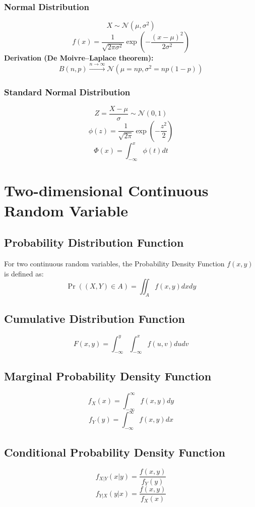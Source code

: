 \documentclass{article}
\begin{document}
\subsubsection{Normal Distribution}
\[ X \sim \mathcal{N}(\mu, \sigma^2) \]
\[
    f(x) = \frac{1}{\sqrt{2\pi\sigma^2}} \exp\left( -\frac{(x-\mu)^2}{2\sigma^2} \right)
\]
\textbf{Derivation (De Moivre–Laplace theorem):}
\[
    B(n, p) \xrightarrow{n \to \infty} \mathcal{N}(\mu = np, \sigma^2 = np(1-p))
\]

\subsubsection{Standard Normal Distribution}
\[ Z = \frac{X-\mu}{\sigma} \sim \mathcal{N}(0,1) \]
\[
    \phi(z) = \frac{1}{\sqrt{2\pi}} \exp\left( -\frac{z^2}{2} \right)
\]
\[
    \Phi(x) = \int_{-\infty}^{x} \phi(t)dt
\]

\newpage
\section{Two-dimensional Continuous Random Variable}

\subsection{Probability Distribution Function}
For two continuous random variables, the Probability Density Function \( f(x,y) \) is defined as:
\[
    \Pr((X,Y) \in A) = \iint_{A} f(x,y) dx dy
\]

\subsection{Cumulative Distribution Function}
\[
    F(x,y) = \int_{-\infty}^{y} \int_{-\infty}^{x} f(u,v) du dv
\]

\subsection{Marginal Probability Density Function}
\[
    f_X(x) = \int_{-\infty}^{\infty} f(x,y)dy
\]
\[
    f_Y(y) = \int_{-\infty}^{\infty} f(x,y)dx
\]

\subsection{Conditional Probability Density Function}
\[
    f_{X|Y}(x|y) = \frac{f(x,y)}{f_Y(y)}
\]
\[
    f_{Y|X}(y|x) = \frac{f(x,y)}{f_X(x)}
\]
\end{document}
